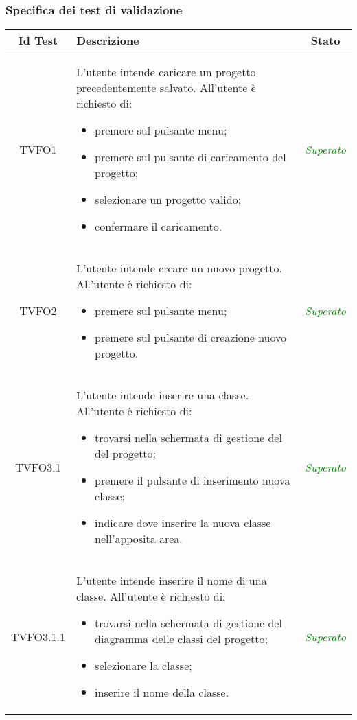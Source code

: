 \subsubsection{Specifica dei test di validazione}
\normalsize
\begin{longtable}{|c|>{}m{8cm}|c|}
\hline 
\textbf{Id Test} & \textbf{Descrizione} & \textbf{Stato}\\
\hline
\endhead
\hypertarget{TVFO1}{TVFO1} & L'utente intende caricare un progetto precedentemente salvato. All'utente è richiesto di:
\begin{itemize}
	\item premere sul pulsante menu;
	\item premere sul pulsante di caricamento del progetto;
	\item selezionare un progetto valido;
	\item confermare il caricamento.
\end{itemize}
 & \textcolor{Green}{\textit{Superato}}\\ \hline
 
\hypertarget{TVFO2}{TVFO2} & L'utente intende creare un  nuovo progetto.
All'utente è richiesto di:
\begin{itemize}
	\item premere sul pulsante menu;
	\item premere sul pulsante di creazione nuovo progetto.
\end{itemize} & \textcolor{Green}{\textit{Superato}}\\ \hline

\hypertarget{TVFO3.1}{TVFO3.1} & L'utente intende inserire una classe.
All'utente è richiesto di:
\begin{itemize}
	\item trovarsi nella schermata di gestione del \gloss{diagramma delle classi} del progetto;
	\item premere il pulsante di inserimento nuova classe;
	\item indicare dove inserire la nuova classe nell'apposita area.
\end{itemize} & \textcolor{Green}{\textit{Superato}}\\ \hline

\hypertarget{TVFO3.1.1}{TVFO3.1.1} & L'utente intende inserire il nome di una classe.
All'utente è richiesto di:
\begin{itemize}
	\item trovarsi nella schermata di gestione del diagramma delle classi del progetto;
	\item selezionare la classe;
	\item inserire il nome della classe.
\end{itemize} & \textcolor{Green}{\textit{Superato}}\\ \hline


\end{longtable}
